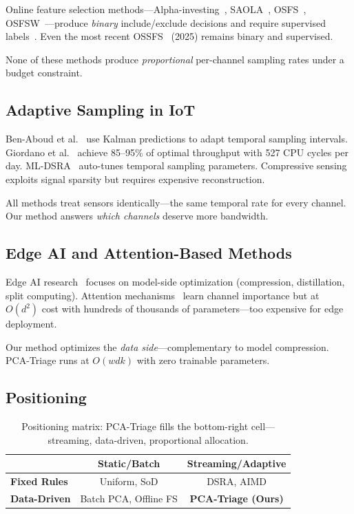 \documentclass[journal]{IEEEtran}
\begin{document}
Online feature selection methods---Alpha-investing~\cite{zhou2006alpha}, SAOLA~\cite{yu2014saola}, OSFS~\cite{wu2013osfs}, OSFSW~\cite{you2018osfsw}---produce \textit{binary} include/exclude decisions and require supervised labels~\cite{zaman2022streaming}. Even the most recent OSSFS~\cite{zhou2025ossfs} (2025) remains binary and supervised.

None of these methods produce \textit{proportional} per-channel sampling rates under a budget constraint.

\subsection{Adaptive Sampling in IoT}

Ben-Aboud et al.~\cite{benaboud2021adaptive} use Kalman predictions to adapt temporal sampling intervals. Giordano et al.~\cite{giordano2023energy} achieve 85--95\% of optimal throughput with 527 CPU cycles per day. ML-DSRA~\cite{mldsra2024parametric} auto-tunes temporal sampling parameters. Compressive sensing~\cite{cs2017survey} exploits signal sparsity but requires expensive reconstruction.

All methods treat sensors identically---the same temporal rate for every channel. Our method answers \textit{which channels} deserve more bandwidth.

\subsection{Edge AI and Attention-Based Methods}

Edge AI research~\cite{gill2024edgeai} focuses on model-side optimization (compression, distillation, split computing). Attention mechanisms~\cite{cao2021mafs, vtt2024transformer, xu2023dcff} learn channel importance but at $O(d^2)$ cost with hundreds of thousands of parameters---too expensive for edge deployment.

Our method optimizes the \textit{data side}---complementary to model compression. PCA-Triage runs at $O(wdk)$ with zero trainable parameters.

\subsection{Positioning}

\begin{table}[t]
\centering
\caption{Positioning matrix: PCA-Triage fills the bottom-right cell---streaming, data-driven, proportional allocation.}
\begin{tabular}{@{}lcc@{}}
\toprule
& \textbf{Static/Batch} & \textbf{Streaming/Adaptive} \\
\midrule
\textbf{Fixed Rules} & Uniform, SoD & DSRA, AIMD \\
\textbf{Data-Driven} & Batch PCA, Offline FS & \textbf{PCA-Triage (Ours)} \\
\bottomrule
\end{tabular}
\label{tab:positioning}
\end{table}
\end{document}

